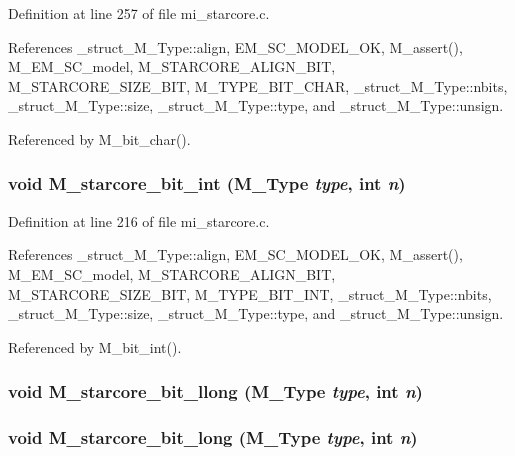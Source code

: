 Definition at line 257 of file mi\_\-starcore.c.

References \_\-struct\_\-M\_\-Type::align, EM\_\-SC\_\-MODEL\_\-OK, M\_\-assert(), M\_\-EM\_\-SC\_\-model, M\_\-STARCORE\_\-ALIGN\_\-BIT, M\_\-STARCORE\_\-SIZE\_\-BIT, M\_\-TYPE\_\-BIT\_\-CHAR, \_\-struct\_\-M\_\-Type::nbits, \_\-struct\_\-M\_\-Type::size, \_\-struct\_\-M\_\-Type::type, and \_\-struct\_\-M\_\-Type::unsign.

Referenced by M\_\-bit\_\-char().
\subsubsection{\setlength{\rightskip}{0pt plus 5cm}void M\_\-starcore\_\-bit\_\-int (\bf{M\_\-Type} {\em type}, int {\em n})}\label{m__starcore_8h_7c1c0bd4a1ec5495ea544464756c4375}




Definition at line 216 of file mi\_\-starcore.c.

References \_\-struct\_\-M\_\-Type::align, EM\_\-SC\_\-MODEL\_\-OK, M\_\-assert(), M\_\-EM\_\-SC\_\-model, M\_\-STARCORE\_\-ALIGN\_\-BIT, M\_\-STARCORE\_\-SIZE\_\-BIT, M\_\-TYPE\_\-BIT\_\-INT, \_\-struct\_\-M\_\-Type::nbits, \_\-struct\_\-M\_\-Type::size, \_\-struct\_\-M\_\-Type::type, and \_\-struct\_\-M\_\-Type::unsign.

Referenced by M\_\-bit\_\-int().
\subsubsection{\setlength{\rightskip}{0pt plus 5cm}void M\_\-starcore\_\-bit\_\-llong (\bf{M\_\-Type} {\em type}, int {\em n})}\label{m__starcore_8h_0fa553c0f124afdf6e9b96f6a8411035}


\subsubsection{\setlength{\rightskip}{0pt plus 5cm}void M\_\-starcore\_\-bit\_\-long (\bf{M\_\-Type} {\em type}, int {\em n})}\label{m__starcore_8h_2745bfd3774bfc3c8647e2eaf89e9f33}





